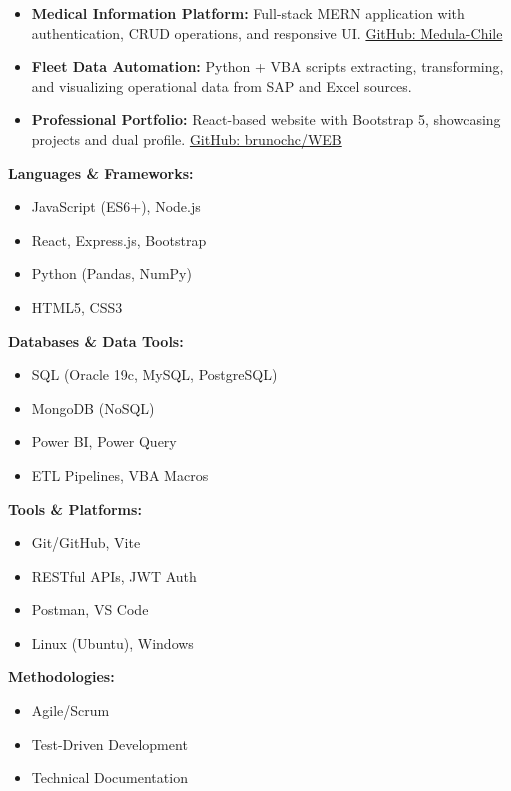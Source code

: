 \documentclass[10pt,letterpaper]{article}
\begin{document}
\begin{itemize}
    \item \textbf{Medical Information Platform:} Full-stack MERN application with authentication, CRUD operations, and responsive UI. \href{https://github.com/Medula-Chile}{GitHub: Medula-Chile}
    \item \textbf{Fleet Data Automation:} Python + VBA scripts extracting, transforming, and visualizing operational data from SAP and Excel sources.
    \item \textbf{Professional Portfolio:} React-based website with Bootstrap 5, showcasing projects and dual profile. \href{https://github.com/brunochc/WEB}{GitHub: brunochc/WEB}
\end{itemize}

\vspace{0.4cm}

\vspace{0.3cm}

\noindent
\begin{minipage}[t]{0.48\textwidth}
\textbf{Languages \& Frameworks:}
\begin{itemize}
    \item JavaScript (ES6+), Node.js
    \item React, Express.js, Bootstrap
    \item Python (Pandas, NumPy)
    \item HTML5, CSS3
\end{itemize}

\vspace{0.2cm}

\textbf{Databases \& Data Tools:}
\begin{itemize}
    \item SQL (Oracle 19c, MySQL, PostgreSQL)
    \item MongoDB (NoSQL)
    \item Power BI, Power Query
    \item ETL Pipelines, VBA Macros
\end{itemize}
\end{minipage}
\hfill
\begin{minipage}[t]{0.48\textwidth}
\textbf{Tools \& Platforms:}
\begin{itemize}
    \item Git/GitHub, Vite
    \item RESTful APIs, JWT Auth
    \item Postman, VS Code
    \item Linux (Ubuntu), Windows
\end{itemize}

\vspace{0.2cm}

\textbf{Methodologies:}
\begin{itemize}
    \item Agile/Scrum
    \item Test-Driven Development
    \item Technical Documentation
\end{itemize}
\end{minipage}
\end{document}
